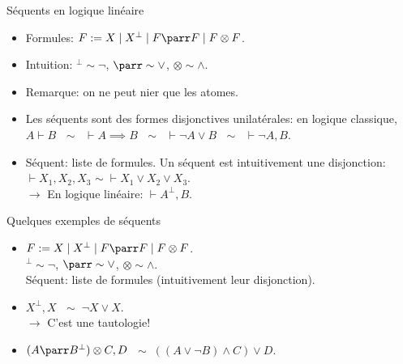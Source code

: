 \documentclass{beamer}
\newcommand*{\orth}{^\perp}
\newcommand*{\tensor}{\otimes}
\begin{document}
\begin{frame}{Séquents en logique linéaire}
    \begin{itemize}
        \item Formules: $F := X \mid X\orth \mid F \parr F \mid F \tensor F$.
            \pause
        \item Intuition: $\orth \sim \neg$, $\parr \sim \lor$, $\tensor \sim \land$.
            \pause
        \item Remarque: on ne peut nier que les atomes.
            \pause \\ 
        \item Les séquents sont des formes disjonctives unilatérales: en logique classique, \\ $A \vdash B$ $\; \sim \; \; \vdash A \implies B$ $\; \sim \; \; \vdash \neg A \lor B$ $\; \sim \; \; \vdash \neg A, B$.\\         \pause
        \item Séquent: liste de formules. Un séquent est intuitivement une disjonction: $\vdash X_1, X_2, X_3$ $\sim \; \vdash X_1 \lor X_2 \lor X_3$. 
        \pause\\
        $\rightarrow$ En logique linéaire: $\vdash A\orth{}, B$.
    \end{itemize}
\end{frame}

\begin{frame}{Quelques exemples de séquents}
    \begin{itemize}
        \item $F := X \mid X\orth \mid F \parr F \mid F \tensor F$.\\
        $\orth \sim \neg$, $\parr \sim \lor$, $\tensor \sim \land$.\\
        Séquent: liste de formules (intuitivement leur disjonction).
            \pause
        \item $X\orth{}, X$ $\; \sim \; \neg X \lor X$. \\
        \pause $\rightarrow$ C'est une tautologie!
            \pause
        \item $(A \parr B\orth{}) \tensor C, D$ $\; \sim \; ((A \lor \neg B) \land C) \lor D$.
    \end{itemize}
\end{frame}
\end{document}
